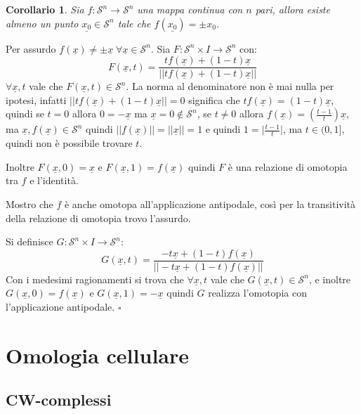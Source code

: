 \documentclass[10pt, twoside=false, x11names]{scrbook}
\newtheorem{corollary}[theorem]{Corollario}
\newenvironment{proof}{{\textbf{Dimostrazione}:}}{\hfill $\square$}
\newcommand{\Sph}[1][]{\mathcal{S}^#1}
\renewcommand{\vec}[1]{\underline{#1}}
\begin{document}
\begin{corollary}
  Sia $ f \colon \Sph{n} \to \Sph{n} $ una mappa continua con $ n $ pari, allora esiste almeno
  un punto $ \vec{x_0} \in \Sph{n} $ tale che $ f(\vec{x_0}) = \pm x_0 $.
\end{corollary}
\begin{proof}
  Per assurdo $ f(\vec{x}) \not = \pm \vec{x} \; \forall \vec{x} \in \Sph{n} $. Sia $ F \colon \Sph{n} \times I \to \Sph{n} $
  con:
  \[
    F(\vec{x}, t) = \frac{t f(\vec{x}) + (1-t)\vec{x}}{|| t f(\vec{x}) + (1-t)\vec{x} ||}
  \]
  $ \forall \vec{x}, t $ vale che $ F(\vec{x}, t) \in \Sph{n} $.
  La norma al denominatore non è mai nulla per ipotesi, infatti $ || t f(\vec{x}) + (1-t) \vec{x} || = 0 $
  significa che $ t f(\vec{x}) = (1-t)\vec{x} $, quindi se $ t = 0 $ allora $ 0 = - \vec{x} $ ma $ \vec{x} = 0 \not \in \Sph{n} $,
  se $ t \not = 0 $ allora $ f(\vec{x}) = \left(\frac{t-1}{t}\right)\vec{x} $, ma $ \vec{x}, f(\vec{x}) \in \Sph{n} $
  quindi $ || f(\vec{x}) || = || \vec{x} || = 1 $ e quindi $ 1 = \big \rvert \frac{t-1}{t}\big \lvert $,
  ma $ t \in (0,1] $, quindi non è possibile trovare $ t $.

  Inoltre $ F(\vec{x}, 0) = \vec{x} $ e $ F(\vec{x}, 1) = f(\vec{x}) $ quindi $ F $ è una relazione di omotopia
  tra $ f $ e l'identità.

  Mostro che $ f $ è anche omotopa all'applicazione antipodale, così per la transitività della
  relazione di omotopia trovo l'assurdo.

  Si definisce  $ G\colon \Sph{n} \times I \to \Sph{n} $:
  \[
    G(\vec{x}, t) = \frac{-t \vec{x} + (1-t)f(\vec{x})}{|| -t \vec{x} + (1-t)f(\vec{x}) ||}
  \]
  Con i medesimi ragionamenti si trova che   $ \forall \vec{x}, t $ vale che $ G(\vec{x}, t) \in \Sph{n} $, e inoltre
  $ G(\vec{x}, 0) = f(\vec{x}) $ e $ G(\vec{x}, 1) = - \vec{x} $ quindi $ G $ realizza
  l'omotopia con l'applicazione antipodale.
\end{proof}


\chapter{Omologia cellulare}

\section{CW-complessi}
\end{document}
